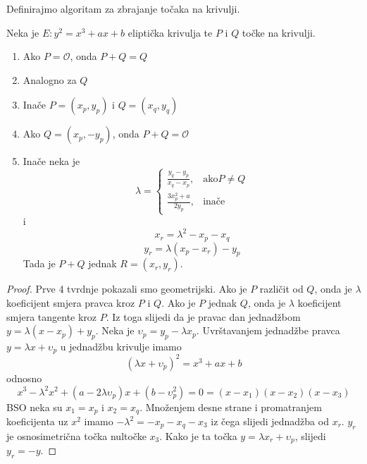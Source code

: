 \documentclass{mathos}
\begin{document}
Definirajmo algoritam za zbrajanje točaka na krivulji.

\begin{defin}
    Neka je
    $E: y^2 = x^3 + ax + b$
    eliptička krivulja te $P$ i $Q$ točke na krivulji.
    \begin{enumerate}
        \item Ako $P = \mathcal{O}$, onda $P + Q = Q$
        \item Analogno za $Q$
        \item Inače $P = (x_p, y_p)$ i $Q = (x_q, y_q)$
        \item Ako $Q = (x_p, -y_p)$, onda $P + Q = \mathcal{O}$
        \item Inače neka je 
            \[ \lambda = \begin{cases}
                \frac{y_q - y_p}{x_q - x_p}, & \text{ako} P \neq Q \\
                \frac{3x_p^2+a}{2y_p}, & \text{inače}
            \end{cases} \]
            i
            \[ x_r = \lambda^2 - x_p - x_q \]
            \[ y_r = \lambda(x_p - x_r) - y_p \]
            Tada je $P + Q$ jednak $R = (x_r, y_r)$.
    \end{enumerate}
\end{defin}
\begin{proof}
    Prve 4 tvrdnje pokazali smo geometrijski.
    Ako je $P$ različit od $Q$, onda je $\lambda$ koeficijent smjera pravca kroz $P$ i $Q$. Ako je $P$ jednak $Q$, onda je $\lambda$ koeficijent smjera tangente kroz $P$. Iz toga slijedi da je pravac dan jednadžbom $y = \lambda (x - x_p) + y_p$. Neka je $\upsilon_p = y_p - \lambda x_p$.
    Uvrštavanjem jednadžbe pravca $y = \lambda x + \upsilon_p$ u jednadžbu krivulje imamo
    \[ (\lambda x + \upsilon_p)^2 = x^3 + ax + b \]
    odnosno
    \[ x^3 - \lambda^2x^2 + (a - 2\lambda\upsilon_p)x + (b - \upsilon_p^2) = 0 = (x - x_1)(x - x_2)(x - x_3) \]
    BSO neka su $x_1 = x_p$ i $x_2 = x_q$. Množenjem desne strane i promatranjem koeficijenta uz $x^2$ imamo $-\lambda^2 = - x_p - x_q - x_3$ iz čega slijedi jednadžba od $x_r$. $y_r$ je osnosimetrična točka nultočke $x_3$. Kako je ta točka $y = \lambda x_r + \upsilon_p$, slijedi $y_r = -y$. 
\end{proof}
\end{document}
